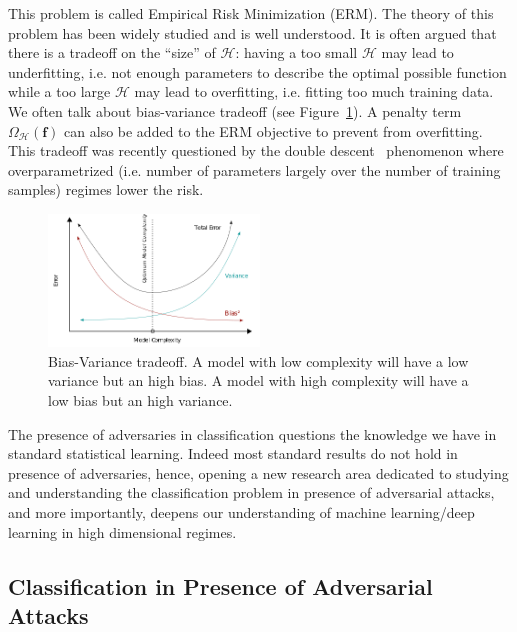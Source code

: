 This problem is called Empirical Risk Minimization (ERM). The theory of this problem has been widely studied and is well understood. It is often argued that there is a tradeoff on the ``size'' of $\mathcal{H}$: having a too small $\mathcal{H}$ may lead to underfitting, i.e. not enough parameters to describe the optimal possible function while a too large $\mathcal{H}$ may lead to overfitting, i.e. fitting too much training data. We often talk about bias-variance tradeoff (see Figure~\ref{fig:tradeoff_bias_accuracy}). A penalty term $\Omega_{\mathcal{H}}(\mathbf{f})$ can also be added to the ERM objective to prevent from overfitting. This tradeoff was recently questioned by the double descent~\citep{belkin2019reconciling} phenomenon where overparametrized (i.e. number of parameters largely over the number of training samples) regimes lower the risk.
\begin{figure}
    \centering
    \includegraphics[width=0.5\textwidth]{Images/tradeoff_bias_variance.png}
    \caption{Bias-Variance tradeoff. A model with low complexity will have a low variance but an high bias. A model with high complexity will have a low bias but an high variance.}
    \label{fig:tradeoff_bias_accuracy}
\end{figure}
\begin{tcolorbox}
The presence of adversaries in classification questions the knowledge we have in standard statistical learning. Indeed most standard results do not hold in presence of adversaries, hence, opening a new research area dedicated to studying and understanding the classification problem in presence of adversarial attacks, and more importantly, deepens our understanding of  machine learning/deep learning in high dimensional regimes.
\end{tcolorbox}


\subsection{Classification in Presence of Adversarial Attacks}

